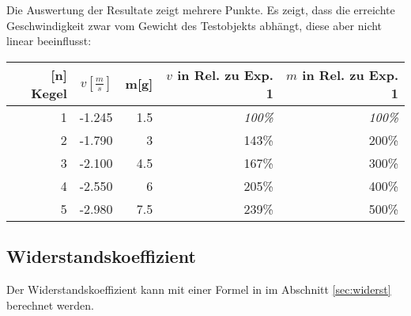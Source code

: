 Die Auswertung der Resultate zeigt mehrere Punkte. Es zeigt, dass die erreichte Geschwindigkeit zwar vom Gewicht des Testobjekts abhängt, diese aber nicht linear beeinflusst:

\begin{tabular}{rrrrr}
	\textbf{[n] Kegel} & \(v[\frac{m}{s}]\) & m[g] & {\small \(v\) in Rel. zu Exp. 1} & {\small \(m\) in Rel. zu Exp. 1} \\ \hline
	1 & -1.245 & 1.5 & \textit{100\%} & \textit{100\%} \\
	2 & -1.790 & 3   & 143\% & 200\% \\
	3 & -2.100 & 4.5 & 167\% & 300\% \\
	4 & -2.550 & 6   & 205\% & 400\% \\
	5 & -2.980 & 7.5 & 239\% & 500\% \\
\end{tabular}

\subsection{Widerstandskoeffizient}

Der Widerstandskoeffizient kann mit einer Formel in im Abschnitt \ref{sec:widerst} berechnet werden.